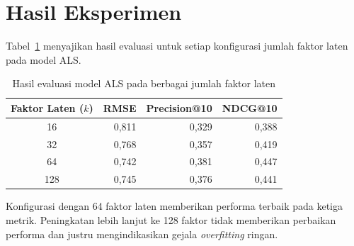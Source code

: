 \section{Hasil Eksperimen}
Tabel~\ref{tab:hasil} menyajikan hasil evaluasi untuk setiap konfigurasi
jumlah faktor laten pada model ALS.

\begin{table}[htb]
\centering
\caption{Hasil evaluasi model ALS pada berbagai jumlah faktor laten}
\label{tab:hasil}
\begin{tabular}{@{}crrr@{}}
\toprule
\textbf{Faktor Laten ($k$)} & \textbf{RMSE} & \textbf{Precision@10} & \textbf{NDCG@10} \\
\midrule
16  & 0,811 & 0,329 & 0,388 \\
32  & 0,768 & 0,357 & 0,419 \\
64  & 0,742 & 0,381 & 0,447 \\
128 & 0,745 & 0,376 & 0,441 \\
\bottomrule
\end{tabular}
\end{table}

Konfigurasi dengan 64 faktor laten memberikan performa terbaik pada ketiga
metrik. Peningkatan lebih lanjut ke 128 faktor tidak memberikan perbaikan
performa dan justru mengindikasikan gejala \emph{overfitting} ringan.
